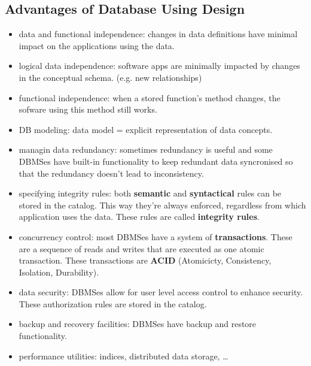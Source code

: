 \subsection{Advantages of Database Using Design}
\begin{itemize}
  \item data and functional independence: changes in data definitions have minimal impact on the applications using the data.
  \item logical data independence: software apps are minimally impacted by changes in the conceptual schema. (e.g. new relationships)
  \item functional independence: when a stored function's method changes, the sofware using this method still works.
  \item DB modeling: data model = explicit representation of data concepts.
  \item managin data redundancy: sometimes redundancy is useful and some DBMSes have built-in functionality to keep redundant data syncronised so that the redundancy doesn't lead to inconsistency.
  \item specifying integrity rules: both \textbf{semantic} and \textbf{syntactical} rules can be stored in the catalog. This way they're always enforced, regardless from which application uses the data. These rules are called \textbf{integrity rules}.
  \item concurrency control: most DBMSes have a system of \textbf{transactions}. These are a sequence of reads and writes that are executed as one atomic transaction. These transactions are \textbf{ACID} (Atomicicty, Consistency, Isolation, Durability).
  \item data security: DBMSes allow for user level access control to enhance security. These authorization rules are stored in the catalog.
  \item backup and recovery facilities: DBMSes have backup and restore functionality.
  \item performance utilities: indices, distributed data storage, \dots
\end{itemize}
